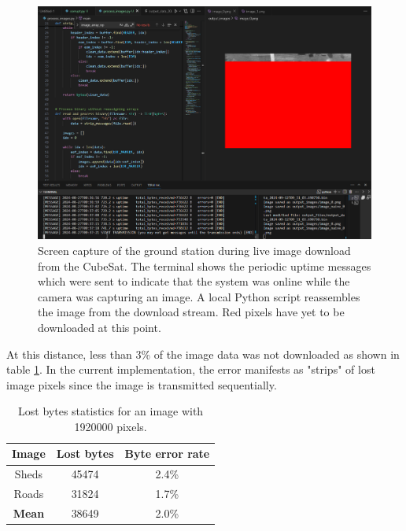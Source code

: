 \documentclass[]{report}
\begin{document}
\begin{figure}[H]
  \centering
  \includegraphics[width=\linewidth]{images/3rd_drone_test_live_reception.png}
  \caption{Screen capture of the ground station during live image download from the CubeSat. The terminal shows the periodic uptime messages which were sent to indicate that the system was online while the camera was capturing an image. A local Python script reassembles the image from the download stream. Red pixels have yet to be downloaded at this point.}
  \label{fig:live-image-reception}
\end{figure}

At this distance, less than 3\% of the image data was not downloaded as shown in table \ref{tabl:image-lost-stats}. In the current implementation, the error manifests as "strips" of lost image pixels since the image is transmitted sequentially.

\begin{table}[H]
  \centering
  \begin{tabular}{|c|c|c|}
    \hline
    \textbf{Image} & \textbf{Lost bytes} & \textbf{Byte error rate} \\\hline
    Sheds          & 45474               & 2.4\%                    \\\hline
    Roads          & 31824               & 1.7\%                    \\\hline
    \textbf{Mean}  & 38649               & 2.0\%                    \\\hline
  \end{tabular}
  \caption{Lost bytes statistics for an image with 1920000 pixels.}
  \label{tabl:image-lost-stats}
\end{table}
\end{document}
